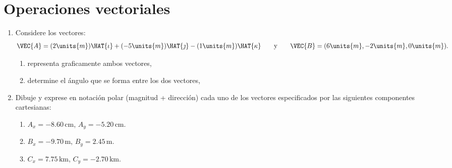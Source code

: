 \setcounter{page}{1}
\setcounter{figure}{0}
\setcounter{chapter}{1}



\chapter{Operaciones vectoriales}
\vspace{-14ex}
\begin{flushright}
\end{flushright}
\raggedright
\begin{enumerate}
\item Considere los  vectores:
$$\VEC{A}=(2\units{m})\HAT{\iota}+(-5\units{m})\HAT{\jmath}-(1\units{m})\HAT{\kappa} \qquad \mbox{y} \qquad\VEC{B}=(6\units{m}, -2\units{m}, 0\units{m}). $$

\begin{enumerate}
\item representa graficamente ambos vectores,
\item determine el \'angulo que se forma entre los dos vectores,
\end{enumerate}

\item  Dibuje y exprese en notaci\'on polar (magnitud + direcci\'on) cada uno de los vectores especificados por las siguientes componentes cartesianas:
\begin{enumerate}
\item $A_x=-8.60 \, \mbox{cm}$, $A_y=-5.20 \, \mbox{cm}$.
\item $B_x=-9.70 \, \mbox{m}$, $B_y=2.45 \, \mbox{m}$.
\item $C_x=7.75 \, \mbox{km}$, $C_y=-2.70 \, \mbox{km}$.
\end{enumerate}



\end{enumerate}
